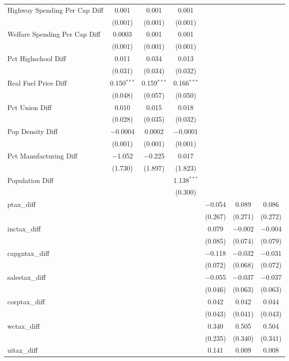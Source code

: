 \begin{table}[!htbp]
\begin{tabular}{@{\extracolsep{5pt}}lcccccc}
  Highway Spending Per Cap Diff & 0.001 & 0.001 & 0.001 &  &  &  \\ 
  & (0.001) & (0.001) & (0.001) &  &  &  \\ 
  Welfare Spending Per Cap Diff & 0.0003 & 0.001 & 0.001 &  &  &  \\ 
  & (0.001) & (0.001) & (0.001) &  &  &  \\ 
  Pct Highschool Diff & 0.011 & 0.034 & 0.013 &  &  &  \\ 
  & (0.031) & (0.034) & (0.032) &  &  &  \\ 
  Real Fuel Price Diff & 0.150$^{***}$ & 0.159$^{***}$ & 0.166$^{***}$ &  &  &  \\ 
  & (0.048) & (0.057) & (0.050) &  &  &  \\ 
  Pct Union Diff & 0.010 & 0.015 & 0.018 &  &  &  \\ 
  & (0.028) & (0.035) & (0.032) &  &  &  \\ 
  Pop Density Diff & $-$0.0004 & 0.0002 & $-$0.0001 &  &  &  \\ 
  & (0.001) & (0.001) & (0.001) &  &  &  \\ 
  Pct Manufacturing Diff & $-$1.052 & $-$0.225 & 0.017 &  &  &  \\ 
  & (1.730) & (1.897) & (1.823) &  &  &  \\ 
  Population Diff &  &  & 1.138$^{***}$ &  &  &  \\ 
  &  &  & (0.300) &  &  &  \\ 
  ptax\_diff &  &  &  & $-$0.054 & 0.089 & 0.086 \\ 
  &  &  &  & (0.267) & (0.271) & (0.272) \\ 
  inctax\_diff &  &  &  & 0.079 & $-$0.002 & $-$0.004 \\ 
  &  &  &  & (0.085) & (0.074) & (0.079) \\ 
  capgntax\_diff &  &  &  & $-$0.118 & $-$0.032 & $-$0.031 \\ 
  &  &  &  & (0.072) & (0.068) & (0.072) \\ 
  salestax\_diff &  &  &  & $-$0.055 & $-$0.037 & $-$0.037 \\ 
  &  &  &  & (0.046) & (0.063) & (0.063) \\ 
  corptax\_diff &  &  &  & 0.042 & 0.042 & 0.044 \\ 
  &  &  &  & (0.043) & (0.041) & (0.043) \\ 
  wctax\_diff &  &  &  & 0.340 & 0.505 & 0.504 \\ 
  &  &  &  & (0.235) & (0.340) & (0.341) \\ 
  uitax\_diff &  &  &  & 0.141 & 0.009 & 0.008 \\ 

\end{tabular}
\end{table}
